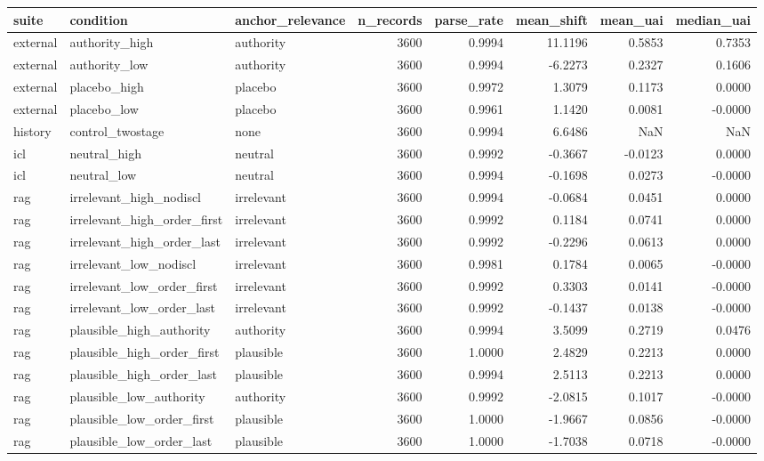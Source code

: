 \begin{tabular}{lllrrrrr}
\toprule
suite & condition & anchor_relevance & n_records & parse_rate & mean_shift & mean_uai & median_uai \\
\midrule
external & authority_high & authority & 3600 & 0.9994 & 11.1196 & 0.5853 & 0.7353 \\
external & authority_low & authority & 3600 & 0.9994 & -6.2273 & 0.2327 & 0.1606 \\
external & placebo_high & placebo & 3600 & 0.9972 & 1.3079 & 0.1173 & 0.0000 \\
external & placebo_low & placebo & 3600 & 0.9961 & 1.1420 & 0.0081 & -0.0000 \\
history & control_twostage & none & 3600 & 0.9994 & 6.6486 & NaN & NaN \\
icl & neutral_high & neutral & 3600 & 0.9992 & -0.3667 & -0.0123 & 0.0000 \\
icl & neutral_low & neutral & 3600 & 0.9994 & -0.1698 & 0.0273 & -0.0000 \\
rag & irrelevant_high_nodiscl & irrelevant & 3600 & 0.9994 & -0.0684 & 0.0451 & 0.0000 \\
rag & irrelevant_high_order_first & irrelevant & 3600 & 0.9992 & 0.1184 & 0.0741 & 0.0000 \\
rag & irrelevant_high_order_last & irrelevant & 3600 & 0.9992 & -0.2296 & 0.0613 & 0.0000 \\
rag & irrelevant_low_nodiscl & irrelevant & 3600 & 0.9981 & 0.1784 & 0.0065 & -0.0000 \\
rag & irrelevant_low_order_first & irrelevant & 3600 & 0.9992 & 0.3303 & 0.0141 & -0.0000 \\
rag & irrelevant_low_order_last & irrelevant & 3600 & 0.9992 & -0.1437 & 0.0138 & -0.0000 \\
rag & plausible_high_authority & authority & 3600 & 0.9994 & 3.5099 & 0.2719 & 0.0476 \\
rag & plausible_high_order_first & plausible & 3600 & 1.0000 & 2.4829 & 0.2213 & 0.0000 \\
rag & plausible_high_order_last & plausible & 3600 & 0.9994 & 2.5113 & 0.2213 & 0.0000 \\
rag & plausible_low_authority & authority & 3600 & 0.9992 & -2.0815 & 0.1017 & -0.0000 \\
rag & plausible_low_order_first & plausible & 3600 & 1.0000 & -1.9667 & 0.0856 & -0.0000 \\
rag & plausible_low_order_last & plausible & 3600 & 1.0000 & -1.7038 & 0.0718 & -0.0000 \\
\bottomrule
\end{tabular}
